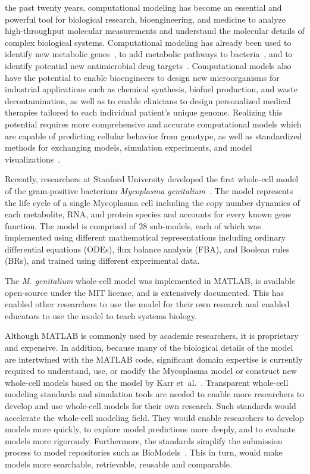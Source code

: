 \documentclass[journal,transmag]{IEEEtran}
\begin{document}
 the past twenty years, computational modeling has become an essential and powerful tool for biological research, bioengineering, and medicine to analyze high-throughput molecular measurements and understand the molecular details of complex biological systems. 
Computational modeling has already been used to identify new metabolic genes~\cite{Reed2006}, to add metabolic pathways to bacteria~\cite{Lee2009}, and to identify potential new antimicrobial drug targets~\cite{Lee2012}. 
Computational models also have the potential to enable bioengineers to design new microorganisms for industrial applications such as chemical synthesis, biofuel production, and waste decontamination, as well as to enable clinicians to design personalized medical therapies tailored to each individual patient's unique genome. 
Realizing this potential requires more comprehensive and accurate computational models which are capable of predicting cellular behavior from genotype, as well as standardized methods for exchanging models, simulation experiments, and model visualizations~\cite{Macklin2014,Karr2015,hucka2015promoting,Klipp07}.

Recently, researchers at Stanford University developed the first whole-cell model of the gram-positive bacterium \textit{Mycoplasma genitalium}~\cite{Karr2012}. 
The model represents the life cycle of a single Mycoplasma cell including the copy number dynamics of each metabolite, RNA, and protein species and accounts for every known gene function. 
The model is comprised of 28 sub-models, each of which was implemented using different mathematical representations including ordinary differential equations (ODEs), flux balance analysis (FBA), and Boolean rules (BRs), and trained using different experimental data. 

The \textit{M. genitalium} whole-cell model was implemented in MATLAB, is available open-source under the MIT license, and is extensively documented. 
This has enabled other researchers to use the model for their own research and enabled educators to use the model to teach systems biology. 

Although MATLAB is commonly used by academic researchers, it is proprietary and expensive. In addition, because many of the biological details of the model are intertwined with the MATLAB code, significant domain expertise is currently required to understand, use, or modify the Mycoplasma model or construct new whole-cell models based on the model by Karr et~al.~\cite{Karr2012}. 
Transparent whole-cell modeling standards and simulation tools are needed to enable more researchers to develop and use whole-cell models for their own research. 
Such standards would accelerate the whole-cell modeling field.
They would enable researchers to develop models more quickly, to explore model predictions more deeply, and to evaluate models more rigorously.
Furthermore, the standards simplify the submission process to model repositories such as BioModels~\cite{li2010biomodels}.
This in turn, would make models more searchable, retrievable, reusable and comparable.
\end{document}
